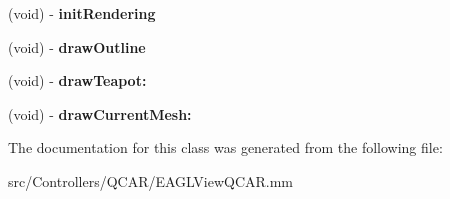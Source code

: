\begin{DoxyCompactItemize}
\item 
\hypertarget{interface_e_a_g_l_view_q_c_a_r_07_private_methods_08_a7ed249e4d566f22937302a6dcc7e74e2}{
(void) -\/ {\bfseries init\-Rendering}}
\label{interface_e_a_g_l_view_q_c_a_r_07_private_methods_08_a7ed249e4d566f22937302a6dcc7e74e2}

\item 
\hypertarget{interface_e_a_g_l_view_q_c_a_r_07_private_methods_08_af021727e44f9feebd8198c2d8d856a30}{
(void) -\/ {\bfseries draw\-Outline}}
\label{interface_e_a_g_l_view_q_c_a_r_07_private_methods_08_af021727e44f9feebd8198c2d8d856a30}

\item 
\hypertarget{interface_e_a_g_l_view_q_c_a_r_07_private_methods_08_ab29d812e91aee923280fa65d6b5c0ce2}{
(void) -\/ {\bfseries draw\-Teapot\-:}}
\label{interface_e_a_g_l_view_q_c_a_r_07_private_methods_08_ab29d812e91aee923280fa65d6b5c0ce2}

\item 
\hypertarget{interface_e_a_g_l_view_q_c_a_r_07_private_methods_08_a0884ce5c67734ab780fb9883b4c92d62}{
(void) -\/ {\bfseries draw\-Current\-Mesh\-:}}
\label{interface_e_a_g_l_view_q_c_a_r_07_private_methods_08_a0884ce5c67734ab780fb9883b4c92d62}

\end{DoxyCompactItemize}


\-The documentation for this class was generated from the following file\-:\begin{DoxyCompactItemize}
\item 
src/\-Controllers/\-Q\-C\-A\-R/\-E\-A\-G\-L\-View\-Q\-C\-A\-R.\-mm\end{DoxyCompactItemize}
